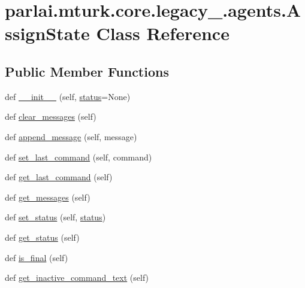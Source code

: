 \hypertarget{classparlai_1_1mturk_1_1core_1_1legacy__2018_1_1agents_1_1AssignState}{}\section{parlai.\+mturk.\+core.\+legacy\+\_.\+agents.\+Assign\+State Class Reference}
\label{classparlai_1_1mturk_1_1core_1_1legacy__2018_1_1agents_1_1AssignState}
\subsection*{Public Member Functions}
\begin{DoxyCompactItemize}
\item 
def \hyperlink{classparlai_1_1mturk_1_1core_1_1legacy__2018_1_1agents_1_1AssignState_a9451ae6465429d1cd27e208fd3f852bf}{\+\_\+\+\_\+init\+\_\+\+\_\+} (self, \hyperlink{classparlai_1_1mturk_1_1core_1_1legacy__2018_1_1agents_1_1AssignState_a256124e49cab161d21001e45e26a391a}{status}=None)
\item 
def \hyperlink{classparlai_1_1mturk_1_1core_1_1legacy__2018_1_1agents_1_1AssignState_aef53107e3d4aa840b7fcca32ef393bf3}{clear\+\_\+messages} (self)
\item 
def \hyperlink{classparlai_1_1mturk_1_1core_1_1legacy__2018_1_1agents_1_1AssignState_af36e4b00767bbb4459ce87fe95b17672}{append\+\_\+message} (self, message)
\item 
def \hyperlink{classparlai_1_1mturk_1_1core_1_1legacy__2018_1_1agents_1_1AssignState_a2aae5b36e3da9791dbb1c5677aa5e24d}{set\+\_\+last\+\_\+command} (self, command)
\item 
def \hyperlink{classparlai_1_1mturk_1_1core_1_1legacy__2018_1_1agents_1_1AssignState_aa578343eefce8c86ab64ab06430f864b}{get\+\_\+last\+\_\+command} (self)
\item 
def \hyperlink{classparlai_1_1mturk_1_1core_1_1legacy__2018_1_1agents_1_1AssignState_a3b76b7bf814eb404117013bed706504d}{get\+\_\+messages} (self)
\item 
def \hyperlink{classparlai_1_1mturk_1_1core_1_1legacy__2018_1_1agents_1_1AssignState_a27ffbfa35ca00b8db0d0062aa476a65c}{set\+\_\+status} (self, \hyperlink{classparlai_1_1mturk_1_1core_1_1legacy__2018_1_1agents_1_1AssignState_a256124e49cab161d21001e45e26a391a}{status})
\item 
def \hyperlink{classparlai_1_1mturk_1_1core_1_1legacy__2018_1_1agents_1_1AssignState_aa06c7d109d7b208a9dcdef0d3fa6c90f}{get\+\_\+status} (self)
\item 
def \hyperlink{classparlai_1_1mturk_1_1core_1_1legacy__2018_1_1agents_1_1AssignState_ac1c93e39da15b6daee60058af9d2f04a}{is\+\_\+final} (self)
\item 
def \hyperlink{classparlai_1_1mturk_1_1core_1_1legacy__2018_1_1agents_1_1AssignState_a68d951e5683ae7b37acbbadbd8f74afa}{get\+\_\+inactive\+\_\+command\+\_\+text} (self)
\end{DoxyCompactItemize}
